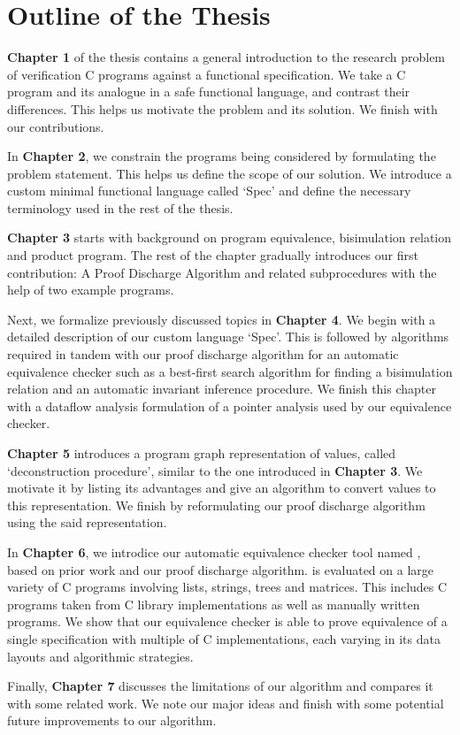 \vspace{-12px}
\section{Outline of the Thesis}
\vspace{-10px}
\label{sec:outlinethesis}
\textbf{Chapter 1} of the thesis contains a general introduction to the research problem of verification C programs against a functional specification.
We take a C program and its analogue in a safe functional language, and contrast their differences. This helps us motivate the problem and its solution.
We finish with our contributions.

In \textbf{Chapter 2}, we constrain the programs being considered by formulating the problem statement. This helps us define the scope of our solution.
We introduce a custom minimal functional language called `Spec' and define the necessary terminology used in the rest of the thesis.

\textbf{Chapter 3} starts with background on program equivalence, bisimulation relation and product program.
The rest of the chapter gradually introduces our first contribution: A Proof Discharge Algorithm and related subprocedures with the help
of two example programs.

Next, we formalize previously discussed topics in \textbf{Chapter 4}. We begin with a detailed description of our custom language `Spec'. This is followed by
algorithms required in tandem with our proof discharge algorithm for an automatic equivalence checker such as a best-first search algorithm
for finding a bisimulation relation and an automatic invariant inference procedure. We finish this chapter with a dataflow analysis formulation
of a pointer analysis used by our equivalence checker.

\textbf{Chapter 5} introduces a program graph representation of values, called `deconstruction procedure', similar to the one introduced in \textbf{Chapter 3}.
We motivate it by listing its advantages and give an algorithm to convert values to this representation. We finish by reformulating our
proof discharge algorithm using the said representation.

In \textbf{Chapter 6}, we introdice our automatic equivalence checker tool named \toolName{}, based on prior work and our proof discharge algorithm.
\toolName{} is evaluated on a large variety of C programs involving lists, strings, trees and matrices.
This includes C programs taken from C library implementations as well as manually written programs. We show that our equivalence checker is able
to prove equivalence of a single specification with multiple of C implementations, each varying in its data layouts and algorithmic
strategies.

Finally, \textbf{Chapter 7} discusses the limitations of our algorithm and compares it with some related work. We note our major ideas and finish with
some potential future improvements to our algorithm.